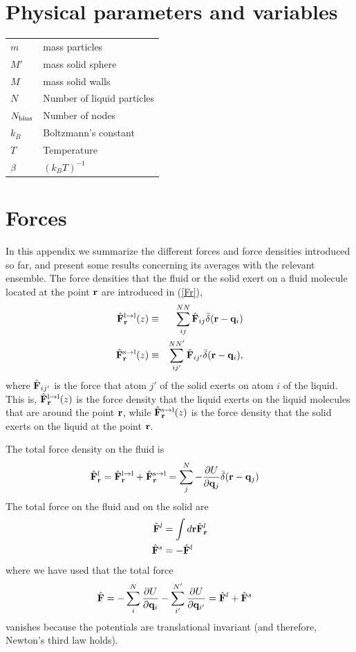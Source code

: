 \documentclass[b5paper,openright,11pt]{book}
\begin{document}
\begin{appendices}
\chapter{Physical parameters and variables}
\begin{tabular}{l l}
    $m$ & mass particles \\
    $M'$ & mass solid sphere \\
    $M$ & mass solid walls \\
    $N$ & Number of liquid particles \\
    $N_{\rm bins}$ & Number of nodes \\
    $k_B$ & Boltzmann's constant \\
    $T$ & Temperature \\
    $\beta$ & $(k_BT)^{-1}$ \\
\end{tabular}

\chapter{Forces}  
\label{Ap:Forces}
In this appendix we summarize the different forces and force densities
introduced so far, and present  some results  concerning its
averages  with the relevant  ensemble.  The  force densities  that the
fluid or the solid exert on a fluid molecule located at the point ${\bf
  r}$ are introduced in (\ref{Fr}),
\begin{eqnarray}
  \hat{\bf F}^{\rm l\to l}_{\bf r}(z) &\equiv& \sum^{NN}_{ij}\hat{\bf F}_{ij}\bar{\delta}({\bf r}-{\bf q}_i)
\nonumber\\
\hat{\bf F}^{\rm s\to l}_{\bf r}(z) &\equiv& \sum^{NN'}_{ij'}\hat{\bf F}_{ij'}\bar{\delta}({\bf r}-{\bf q}_i),
\label{Fr_ap}
\end{eqnarray}
where $\hat{\bf  F}_{ij'}$ is the  force that  atom $j'$ of  the solid
exerts on  atom $i$ of  the liquid.   This is, $\hat{\bf  F}^{\rm l\to
  l}_{\bf r}(z) $  is the force density that the  liquid exerts on the
liquid molecules that are around  the point ${\bf r}$, while $\hat{\bf
  F}^{\rm  s\to l}_{\bf  r}(z)$ is  the force  density that  the solid
exerts on the liquid at the point ${\bf r}$.

The total force density on the fluid is
\begin{align}
  \hat{\bf F}^l_{\bf r}&=\hat{\bf F}^{\rm l\to l}_{\bf r}+\hat{\bf F}^{\rm s\to l}_{\bf r} =\sum^{N}_{j}-\frac{\partial U}{\partial {\bf q}_{j}}\bar{\delta}({\bf r}-{\bf q}_j)
\end{align}
The total force on the fluid and on the solid are
\begin{align}
  \hat{\bf F}^l&=\int d{\bf r}\hat{\bf F}^l_{\bf r}
\nonumber\\
  \hat{\bf F}^s&= -\hat{\bf F}^l
\end{align}
where we have used that the total force
\begin{align}
  \hat{\bf F}&=-\sum^N_{i}\frac{\partial U}{\partial {\bf q}_i}
-\sum^{N'}_{i'}\frac{\partial U}{\partial {\bf q}_{i'}}
=\hat{\bf F}^l+\hat{\bf F}^s
\end{align}
 vanishes because the  potentials are translational invariant (and
therefore, Newton's third law holds).


\end{appendices}
\end{document}

